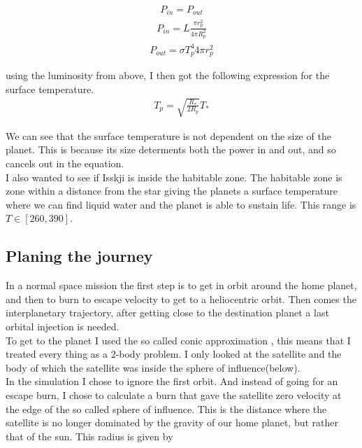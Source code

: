 \documentclass[a4paper, 10pt]{article}
\begin{document}
\begin{align}
P_{in} = P_{out}
\end{align}
\begin{align}
 P_{in} = L \frac{\pi r_p^2}{4\pi R_p^2}
\end{align}
\begin{align}
 P_{out} = \sigma T_p^4 4\pi r_p^2
\end{align}

using the luminosity from above, I then got the following expression for the surface temperature.
\begin{align}\label{eq:temp}
 T_p = \sqrt{\frac{R_*}{2R_p}}T_*
\end{align}

We can see that the surface temperature is not dependent on the size of the planet. This is because its size  determents both the power in and out, and so cancels out in the equation.\\

I also wanted to see if Isskji is inside the habitable zone. The habitable zone is zone within a distance from the star giving the planets a surface temperature where we can find liquid water and the planet is able to sustain life. This range is $T \in [260 , 390]$.

\subsection{Planing the journey}
In a normal space mission the first step is to get in orbit around the home planet, and then to burn to escape velocity to get to a heliocentric orbit. Then comes the interplanetary trajectory, after getting close to the destination planet a last orbital injection is needed.\\

To get to the planet I used the so called conic approximation \cite{SpaceDynamics}, this means that I treated every thing as a 2-body problem. I only looked at the satellite and the body of which the satellite was inside the sphere of influence(below). \\

In the simulation I chose to ignore the first orbit. And instead of going for an escape burn, I chose to calculate a burn that gave the satellite zero velocity at the edge of the so called sphere of influence. This is the distance where the satellite is no longer dominated by the gravity of our home planet, but rather that of the sun. This radius is given by\cite{sphere}
\end{document}
